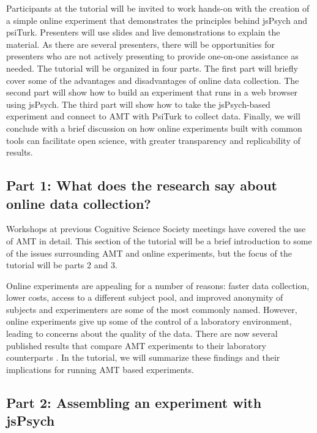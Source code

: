 \documentclass[10pt,letterpaper]{article}
\begin{document}
Participants at the tutorial will be invited to work hands-on with the creation of a simple online experiment that demonstrates the principles behind jsPsych and psiTurk. Presenters will use slides and live demonstrations to explain the material. As there are several presenters, there will be opportunities for presenters who are not actively presenting to provide one-on-one assistance as needed. The tutorial will be organized in four parts. The first part will briefly cover some of the advantages and disadvantages of online data collection. The second part will show how to build an experiment that runs in a web browser using jsPsych. The third part will show how to take the jsPsych-based experiment and connect to AMT with PsiTurk to collect data. Finally, we will conclude with a brief discussion on how online experiments built with common tools can facilitate open science, with greater transparency and replicability of results.

\subsection{Part 1: What does the research say about online data collection?}

Workshops at previous Cognitive Science Society meetings have covered the use of AMT in detail. This section of the tutorial will be a brief introduction to some of the issues surrounding AMT and online experiments, but the focus of the tutorial will be parts 2 and 3.

Online experiments are appealing for a number of reasons: faster data collection, lower costs, access to a different subject pool, and improved anonymity of subjects and experimenters are some of the most commonly named. However, online experiments give up some of the control of a laboratory environment, leading to concerns about the quality of the data. There are now several published results that compare AMT experiments to their laboratory counterparts \cite{paolacci2010running, buhrmester2011amazon, zwann2012revisiting, crump2013evaluating, goodman2013data}. In the tutorial, we will summarize these findings and their implications for running AMT based experiments. 
  
\subsection{Part 2: Assembling an experiment with jsPsych}
\end{document}
